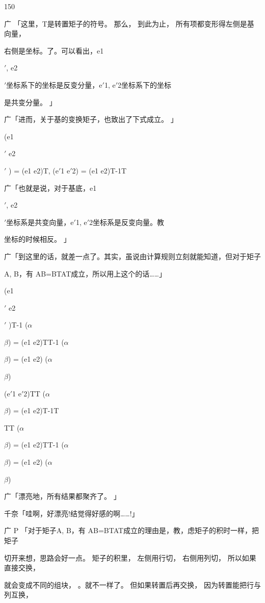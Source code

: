 150\par
广 「这里，T是转置矩子的符号。 那么， 到此为止， 所有项都变形得左侧是基向量，\par
右侧是坐标。了。可以看出，e1\par
$\prime$, e2\par
$\prime$坐标系下的坐标是反变分量，e$\prime$1, e$\prime$2坐标系下的坐标\par
是共变分量。 」\par
广「进而，关于基的变换矩子，也致出了下式成立。 」\par
(e1\par
$\prime$ e2\par
$\prime$ ) = (e1 e2)T, (e$\prime$1 e$\prime$2) = (e1 e2)T-1T\par
广「也就是说，对于基底，e1\par
$\prime$, e2\par
$\prime$坐标系是共变向量，e$\prime$1, e$\prime$2坐标系是反变向量。教\par
坐标的时候相反。 」\par
广「到这里的话，就差一点了。其实，虽说由计算规则立刻就能知道，但对于矩子\par
A, B，有 AB=BTAT成立，所以用上这个的话……」\par
(e1\par
$\prime$ e2\par
$\prime$ )T-1 ($\alpha$\par
$\beta$) = (e1 e2)TT-1 ($\alpha$\par
$\beta$) = (e1 e2) ($\alpha$\par
$\beta$)\par
(e$\prime$1 e$\prime$2)TT ($\alpha$\par
$\beta$) = (e1 e2)T-1T\par
TT ($\alpha$\par
$\beta$) = (e1 e2)TT-1 ($\alpha$\par
$\beta$) = (e1 e2) ($\alpha$\par
$\beta$)\par
广「漂亮地，所有结果都聚齐了。 」\par
千奈「哇啊，好漂亮!结觉得好感的啊……!」\par
广 P 「对于矩子A, B，有 AB=BTAT成立的理由是，教，虑矩子的积时一样，把矩子\par
切开来想，思路会好一点。 矩子的积里， 左侧用行切， 右侧用列切， 所以如果直接交换，\par
就会变成不同的组块， 。就不一样了。 但如果转置后再交换， 因为转置能把行与列互换，\par
